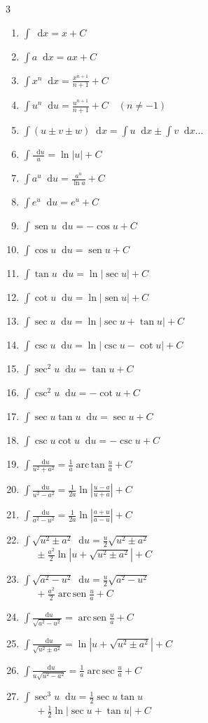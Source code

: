 \documentclass[9pt,landscape,a4paper]{article}
\newcommand{\dd}{\mathop{}\!\mathrm{d}}
\DeclareMathOperator{\sen}{sen}
\DeclareMathOperator{\arcsen}{arc\,sen}
\renewcommand{\arctan}{\operatorname{arc\,tan}}
\DeclareMathOperator{\arcsec}{arc\,sec}
\begin{document}
\begin{multicols}{3}
\columnbreak

\begin{tcolorbox}[colback=primary!3,colframe=primary,fonttitle=\bfseries,title=Tabla de Integrales]
\begin{enumerate}
\item $\int \dd x = x + C$
\item $\int a \dd x = ax + C$
\item $\int x^n \dd x = \frac{x^{n+1}}{n+1} + C$
\item $\int u^n \dd u = \frac{u^{n+1}}{n+1} + C \quad {\scriptstyle (n \neq -1)}$
\item $\int (u \pm v \pm w) \dd x = \int u\dd x \pm \int v\dd x \dots$
\item $\int \frac{\dd u}{u} = \ln|u| + C$
\item $\int a^u \dd u = \frac{a^u}{\ln a} + C$
\item $\int e^u \dd u = e^u + C$
\item $\int \sen u \dd u = -\cos u + C$
\item $\int \cos u \dd u = \sen u + C$
\item $\int \tan u \dd u = \ln|\sec u| + C$
\item $\int \cot u \dd u = \ln|\sen u| + C$
\item $\int \sec u \dd u = \ln|\sec u + \tan u| + C$
\item $\int \csc u \dd u = \ln|\csc u - \cot u| + C$
\item $\int \sec^2 u \dd u = \tan u + C$
\item $\int \csc^2 u \dd u = -\cot u + C$
\item $\int \sec u \tan u \dd u = \sec u + C$
\item $\int \csc u \cot u \dd u = -\csc u + C$
\item $\int \frac{\dd u}{u^2 + a^2} = \frac{1}{a} \arctan \frac{u}{a} + C$
\item $\int \frac{\dd u}{u^2 - a^2} = \frac{1}{2a} \ln\left|\frac{u-a}{u+a}\right| + C$
\item $\int \frac{\dd u}{a^2 - u^2} = \frac{1}{2a} \ln\left|\frac{a+u}{a-u}\right| + C$
\item $\int \sqrt{u^2 \pm a^2} \dd u = \frac{u}{2}\sqrt{u^2 \pm a^2}$ \\ $\phantom{=} \pm \frac{a^2}{2}\ln|u + \sqrt{u^2 \pm a^2}| + C$
\item $\int \sqrt{a^2 - u^2} \dd u = \frac{u}{2}\sqrt{a^2 - u^2}$ \\ $\phantom{=} + \frac{a^2}{2}\arcsen \frac{u}{a} + C$
\item $\int \frac{\dd u}{\sqrt{a^2 - u^2}} = \arcsen \frac{u}{a} + C$
\item $\int \frac{\dd u}{\sqrt{u^2 \pm a^2}} = \ln|u + \sqrt{u^2 \pm a^2}| + C$
\item $\int \frac{\dd u}{u\sqrt{u^2 - a^2}} = \frac{1}{a} \arcsec \frac{u}{a} + C$
\item $\int \sec^3 u \dd u = \frac{1}{2}\sec u \tan u$ \\ $\phantom{=} + \frac{1}{2}\ln|\sec u + \tan u| + C$
\end{enumerate}
\end{tcolorbox}


\end{multicols}
\end{document}
